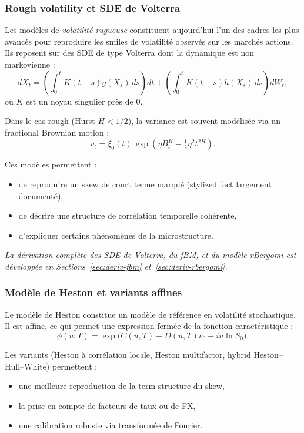 \documentclass[11pt,a4paper]{article}
\newcommand{\1}{\mathbf{1}}
\begin{document}
\subsubsection{Rough volatility et SDE de Volterra}

Les mod\`eles de \emph{volatilit\'e rugueuse} constituent aujourd'hui l'un des cadres
les plus avancés pour reproduire les smiles de volatilité observés sur les
marchés actions. Ils reposent sur des SDE de type Volterra dont la dynamique
est non markovienne :
\[
dX_t
=
\left(
 \int_0^t K(t-s) g(X_s)\, ds
\right) dt
+
\left(
 \int_0^t K(t-s) h(X_s)\, ds
\right) dW_t,
\]
o\`u $K$ est un noyau singulier près de $0$.

Dans le cas rough (Hurst $H<1/2$), la variance est souvent modélisée via un
fractional Brownian motion :
\[
v_t =
\xi_0(t)\,
\exp\!\left(
\eta B_t^H - \tfrac12 \eta^2 t^{2H}
\right).
\]

Ces mod\`eles permettent :
\begin{itemize}
  \item de reproduire un skew de court terme marqu\'e (stylized fact largement document\'e),
  \item de d\'ecrire une structure de corr\'elation temporelle cohérente,
  \item d'expliquer certains ph\'enom\`enes de la microstructure.
\end{itemize}

\emph{La d\'erivation compl\`ete des SDE de Volterra, du fBM, et du mod\`ele rBergomi
est d\'evelopp\'ee en Sections~\ref{sec:deriv-fbm} et~\ref{sec:deriv-rbergomi}.}

\subsubsection{Mod\`ele de Heston et variants affines}

Le mod\`ele de Heston constitue un mod\`ele de r\'ef\'erence en volatilité stochastique.
Il est affine, ce qui permet une expression ferm\'ee de la fonction caract\'eristique :
\[
\phi(u;T) =
\exp \bigl(C(u,T) + D(u,T) v_0 + i u \ln S_0 \bigr).
\]

Les variants (Heston à corrélation locale, Heston multifactor, hybrid Heston--Hull--White)
permettent :
\begin{itemize}
  \item une meilleure reproduction de la term-structure du skew,
  \item la prise en compte de facteurs de taux ou de FX,
  \item une calibration robuste via transformée de Fourier.
\end{itemize}
\end{document}
